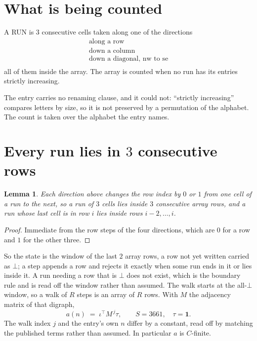 \documentclass[11pt,a4paper]{article}
\theoremstyle{plain}
\newtheorem{lemma}[theorem]{Lemma}
\theoremstyle{definition}
\begin{document}
\section{What is being counted}

A RUN is $3$ consecutive cells taken along one of the directions
\[
\begin{array}{l}
\text{along a row} \\
\text{down a column} \\
\text{down a diagonal, nw to se} \\
\end{array}
\]
all of them inside the array. The array is counted when no run has its entries strictly increasing.


The entry carries no renaming clause, and it could not: ``strictly increasing'' compares
letters by size, so it is not preserved by a permutation of the alphabet. The count is taken
over the alphabet the entry names.

\section{Every run lies in $3$ consecutive rows}

\begin{lemma}\label{lem:win}
Each direction above changes the row index by $0$ or $1$ from one cell of a run to the next, so
a run of $3$ cells lies inside $3$ consecutive array rows, and a run whose last cell is in
row $i$ lies inside rows $i-2,\dots,i$.
\end{lemma}

\begin{proof}
Immediate from the row steps of the four directions, which are $0$ for a row and $1$ for the
other three.
\end{proof}

So the state is the window of the last $2$ array rows, a row not yet written carried as
$\bot$; a step appends a row and rejects it exactly when some run ends in it or lies inside it.
A run needing a row that is $\bot$ does not exist, which is the boundary rule and is read off
the window rather than assumed. The walk starts at the all-$\bot$ window, so a walk of $R$ steps
is an array of $R$ rows. With $M$ the adjacency matrix of that digraph,
\[
a(n)\;=\;\iota^{\!\top}M^{\,j}\tau ,\qquad S=3661,\quad\tau=\mathbf{1} .
\]
The walk index $j$ and the entry's own $n$ differ by a constant, read off by matching the
published terms rather than assumed. In particular $a$ is $C$-finite.
\end{document}
